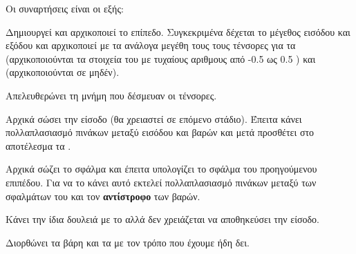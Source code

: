 Οι συναρτήσεις είναι οι εξής:
\begin{description}
    \sloppy
    \item[\en{Desne (constructor)}] Δημιουργεί και αρχικοποιεί το επίπεδο. Συγκεκριμένα δέχεται το μέγεθος εισόδου και εξόδου και αρχικοποιεί με τα ανάλογα μεγέθη τους τους τένσορες για τα  (αρχικοποιούνται τα στοιχεία του με
    τυχαίους αριθμους από -0.5 ως 0.5 )  και  (αρχικοποιούνται σε μηδέν).
    \item[\en{\~\ Desne (destructor)}] Απελευθερώνει τη μνήμη που δέσμευαν οι τένσορες.
    \item[\en{forward}] Αρχικά σώσει την είσοδο (θα χρειαστεί σε επόμενο στάδιο). Έπειτα κάνει πολλαπλασιασμό πινάκων μεταξύ εισόδου και βαρών και μετά προσθέτει στο αποτέλεσμα τα .
    \item[\en{backwards}] Αρχικά σώζει το σφάλμα και έπειτα υπολογίζει το σφάλμα του προηγούμενου επιπέδου. Για να το κάνει αυτό εκτελεί πολλαπλασιασμό πινάκων μεταξύ των σφαλμάτων του και τον \textbf{αντίστροφο} των βαρών.
    \item[\en{predict}] Κάνει την ίδια δουλειά με το  αλλά δεν χρειάζεται να αποθηκεύσει την είσοδο.
    \item[\en{fix}] Διορθώνει τα βάρη και τα  με τον τρόπο που έχουμε ήδη δει.
\end{description}

